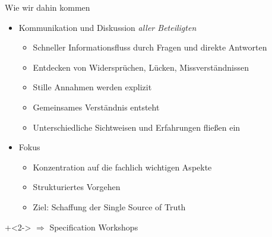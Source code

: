 %
%
%
%

\begin{frame}{Wie wir dahin kommen}


\begin{itemize}
	\item Kommunikation und Diskussion \em aller \em Beteiligten 
	\begin{itemize}
		\item Schneller Informationsfluss durch Fragen und direkte Antworten
		\item Entdecken von Widersprüchen, Lücken, Missverständnissen
		\item Stille Annahmen werden explizit
		\item Gemeinsames Verständnis entsteht
		\item Unterschiedliche Sichtweisen und Erfahrungen fließen ein
	\end{itemize}
	
	\item Fokus
	\begin{itemize}
		\item Konzentration auf die fachlich wichtigen Aspekte
                \item Strukturiertes Vorgehen
		\item Ziel: Schaffung der Single Source of Truth
	\end{itemize}
\end{itemize}


\vspace{1em}

\onslide+<2->
$\Rightarrow$ Specification Workshops

\end{frame}


